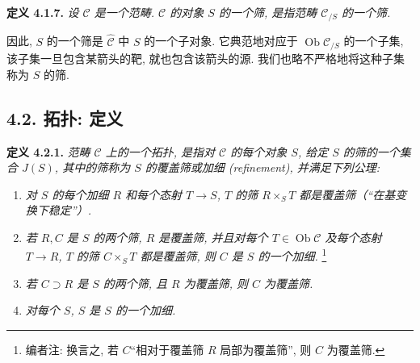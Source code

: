 \medskip
\noindent{}\textbf{定义 4.1.7.}
\textit{设 \(\mathscr C\) 是一个范畴.
\(\mathscr C\) 的\emph{对象} \(S\) 的一个\emph{筛},
是指范畴 \(\mathscr C_{/S}\) 的一个筛.}

因此, \(S\) 的一个筛是 \(\widehat{\mathscr C}\) 中 \(S\) 的一个子对象.
它典范地对应于 \(\operatorname{Ob}\mathscr C_{/S}\) 的一个子集,
该子集一旦包含某箭头的靶, 就也包含该箭头的源.
我们也略不严格地将这种子集称为 \(S\) 的筛.

\subsection*{4.2. 拓扑: 定义}

\medskip
\noindent{}\textbf{定义 4.2.1.}
\textit{范畴 \(\mathscr C\) 上的一个\emph{拓扑},
是指对 \(\mathscr C\) 的每个对象 \(S\), 给定 \(S\) 的筛的一个集合
\(J(S)\), 其中的筛称为 \(S\) 的\emph{覆盖筛}或\emph{加细 (refinement)},
并满足下列公理:}
\begin{enumerate}
 \item[(T 1)] \textit{对 \(S\)
 的每个加细 \(R\) 和每个态射 \(T\to S\), \(T\) 的筛
 \(R\times_ST\) 都是覆盖筛（“在基变换下稳定”）.}
 \item[(T 2)] \textit{若
 \(R,C\) 是 \(S\) 的两个筛, \(R\) 是覆盖筛,
 并且对每个 \(T\in\operatorname{Ob}\mathscr C\) 及每个态射
 \(T\to R\), \(T\) 的筛 \(C\times_ST\) 都是覆盖筛,
 则 \(C\) 是 \(S\) 的一个加细.}
 \footnote{编者注: 换言之, 若 \(C\)“相对于覆盖筛 \(R\) 局部为覆盖筛”,
 则 \(C\) 为覆盖筛.}
 \item[(T 3)] \textit{若
 \(C\supset R\) 是 \(S\) 的两个筛, 且 \(R\) 为覆盖筛,
 则 \(C\) 为覆盖筛.}
 \item[(T 4)] \textit{对每个
 \(S\), \(S\) 是 \(S\) 的一个加细.}
\end{enumerate}


